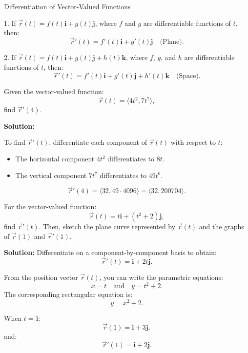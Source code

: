 \documentclass[12pt]{article}
\theoremstyle{beautifulthm}
\begin{document}
\begin{mytheorem}{Differentiation of Vector-Valued Functions}{}



1. If $\vec{r}(t) = f(t)\mathbf{i} + g(t)\mathbf{j}$, where $f$ and $g$ are differentiable functions of $t$, then:
\[
\vec{r}'(t) = f'(t)\mathbf{i} + g'(t)\mathbf{j} \quad \text{(Plane)}.
\]

2. If $\vec{r}(t) = f(t)\mathbf{i} + g(t)\mathbf{j} + h(t)\mathbf{k}$, where $f$, $g$, and $h$ are differentiable functions of $t$, then:
\[
\vec{r}'(t) = f'(t)\mathbf{i} + g'(t)\mathbf{j} + h'(t)\mathbf{k} \quad \text{(Space)}.
\]
    
\end{mytheorem}


\begin{tcolorbox}[colback=examplebg, colframe=red!75!black, title=\textbf{EXAMPLE 2: Finding the Derivative of a Vector-Valued Function}, fonttitle=\bfseries, sharp corners]
Given the vector-valued function:
\[
\vec{r}(t) = \langle 4t^2, 7t^7 \rangle,
\]
find $\vec{r}'(4)$.


\tcblower
\textbf{Solution:} 

To find $\vec{r}'(t)$, differentiate each component of $\vec{r}(t)$ with respect to $t$:
\begin{itemize}
    \item The horizontal component $4t^2$ differentiates to $8t$.
    \item The vertical component $7t^7$ differentiates to $49t^6$.
\end{itemize}
\[
\vec{r}'(4) = \langle 32, 49 \cdot 4096 \rangle = \langle 32, 200704 \rangle.
\]
\end{tcolorbox}


\begin{tcolorbox}[colback=examplebg, colframe=red!75!black, title=\textbf{EXAMPLE 3: Differentiation of a Vector-Valued Function}, fonttitle=\bfseries, sharp corners]

For the vector-valued function:
\[
\vec{r}(t) = t\mathbf{i} + (t^2 + 2)\mathbf{j},
\]
find $\vec{r}'(t)$. Then, sketch the plane curve represented by $\vec{r}(t)$ and the graphs of $\vec{r}(1)$ and $\vec{r}'(1)$.

\tcblower
\textbf{Solution:} 
Differentiate on a component-by-component basis to obtain:
\[
\vec{r}'(t) = \mathbf{i} + 2t\mathbf{j}.
\]

From the position vector $\vec{r}(t)$, you can write the parametric equations:
\[
x = t \quad \text{and} \quad y = t^2 + 2.
\]
The corresponding rectangular equation is:
\[
y = x^2 + 2.
\]

When $t = 1$:
\[
\vec{r}(1) = \mathbf{i} + 3\mathbf{j},
\]
and:
\[
\vec{r}'(1) = \mathbf{i} + 2\mathbf{j}.
\]
\end{tcolorbox}
\end{document}
